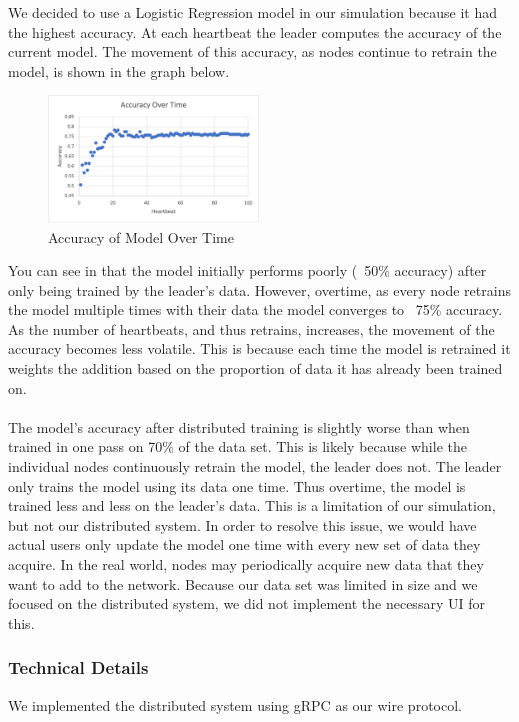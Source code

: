 \documentclass{article}
\begin{document}
We decided to use a Logistic Regression model in our simulation because it had the highest accuracy. At each heartbeat the leader computes the accuracy of the current model. The movement of this accuracy, as nodes continue to retrain the model, is shown in the graph below.

\begin{figure}[h]
    \centering
    \includegraphics[width=0.5\textwidth]{accuracy.png}
    \caption{Accuracy of Model Over Time}
    \label{fig:accuracy}

\end{figure}

You can see in  that the model initially performs poorly (~50\% accuracy) after only being trained by the leader's data. However, overtime, as every node retrains the model multiple times with their data the model converges to ~75\% accuracy. As the number of heartbeats, and thus retrains, increases, the movement of the accuracy becomes less volatile. This is because each time the model is retrained it weights the addition based on the proportion of data it has already been trained on. 
\\
\\
The model's accuracy after distributed training is slightly worse than when trained in one pass on 70\% of the data set. This is likely because while the individual nodes continuously retrain the model, the leader does not. The leader only trains the model using its data one time. Thus overtime, the model is trained less and less on the leader's data. This is a limitation of our simulation, but not our distributed system. In order to resolve this issue, we would have actual users only update the model one time with every new set of data they acquire. In the real world, nodes may periodically acquire new data that they want to add to the network. Because our data set was limited in size and we focused on the distributed system, we did not implement the necessary UI for this.

\subsubsection{Technical Details}
We implemented the distributed system using gRPC as our wire protocol. 
\end{document}
